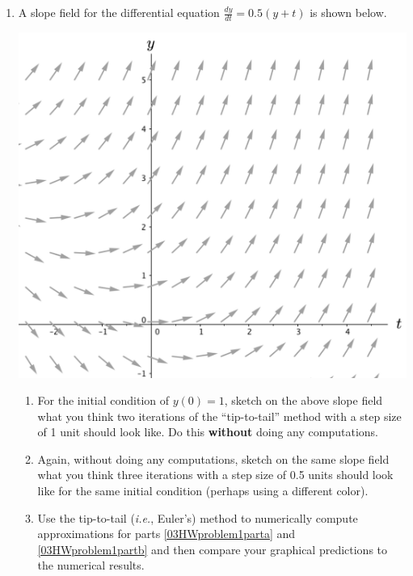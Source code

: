 \clearpage
 \begin{enumerate}

\item A slope field for the differential equation $\displaystyle\frac{dy}{dt}=0.5(y+t)$ is shown below. \label{03HWproblem1}
\begin{center}
\includegraphics[width=6in]{03/03HWSlopeField1.png}
\end{center}
\begin{enumerate}
\item	For the initial condition of $y(0) = 1$, sketch on the above slope field what you think two iterations of the ``tip-to-tail'' method with a step size of 1 unit should look like. Do this \textbf{without} doing any computations. \label{03HWproblem1parta}
\item	Again, without doing any computations, sketch on the same slope field what you think three iterations with a step size of 0.5 units should look like for the same initial condition (perhaps using a different color). \label{03HWproblem1partb}
\item	Use the tip-to-tail ({\em i.e.}, Euler's) method to numerically compute approximations for parts \ref{03HWproblem1parta} and \ref{03HWproblem1partb} and then compare your graphical predictions to the numerical results. \label{03HWproblem1partc}
\end{enumerate}


\end{enumerate}
